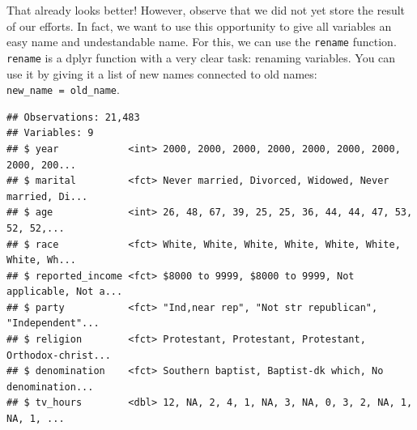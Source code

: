 \documentclass[]{tufte-book}
\newenvironment{Shaded}{}{}
\newcommand{\DataTypeTok}[1]{\textcolor[rgb]{0.56,0.13,0.00}{#1}}
\newcommand{\KeywordTok}[1]{\textcolor[rgb]{0.00,0.44,0.13}{\textbf{#1}}}
\newcommand{\NormalTok}[1]{#1}
\newcommand{\OperatorTok}[1]{\textcolor[rgb]{0.40,0.40,0.40}{#1}}
\newcommand{\StringTok}[1]{\textcolor[rgb]{0.25,0.44,0.63}{#1}}
\begin{document}
That already looks better! However, observe that we did not yet store the result of our efforts. In fact, we want to use this opportunity to give all variables an easy name and undestandable name. For this, we can use the \texttt{rename} function. \texttt{rename} is a dplyr function with a very clear task: renaming variables. You can use it by giving it a list of new names connected to old names: \texttt{new\_name\ =\ old\_name}.

\begin{Shaded}
\end{Shaded}

\begin{verbatim}
## Observations: 21,483
## Variables: 9
## $ year            <int> 2000, 2000, 2000, 2000, 2000, 2000, 2000, 2000, 200...
## $ marital         <fct> Never married, Divorced, Widowed, Never married, Di...
## $ age             <int> 26, 48, 67, 39, 25, 25, 36, 44, 44, 47, 53, 52, 52,...
## $ race            <fct> White, White, White, White, White, White, White, Wh...
## $ reported_income <fct> $8000 to 9999, $8000 to 9999, Not applicable, Not a...
## $ party           <fct> "Ind,near rep", "Not str republican", "Independent"...
## $ religion        <fct> Protestant, Protestant, Protestant, Orthodox-christ...
## $ denomination    <fct> Southern baptist, Baptist-dk which, No denomination...
## $ tv_hours        <dbl> 12, NA, 2, 4, 1, NA, 3, NA, 0, 3, 2, NA, 1, NA, 1, ...
\end{verbatim}
\end{document}
